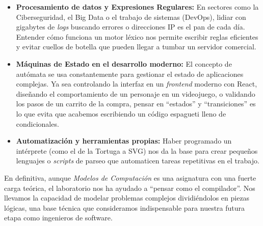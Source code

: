 \documentclass[12pt,a4paper]{article}
\begin{document}
\begin{itemize}
    \item \textbf{Procesamiento de datos y Expresiones Regulares:} En sectores como la Ciberseguridad, el Big Data o el trabajo de sistemas (DevOps), lidiar con gigabytes de \textit{logs} buscando errores o direcciones IP es el pan de cada día. Entender cómo funciona un motor léxico nos permite escribir reglas eficientes y evitar cuellos de botella que pueden llegar a tumbar un servidor comercial.
    \item \textbf{Máquinas de Estado en el desarrollo moderno:} El concepto de autómata se usa constantemente para gestionar el estado de aplicaciones complejas. Ya sea controlando la interfaz en un \textit{frontend} moderno con React, diseñando el comportamiento de un personaje en un videojuego, o validando los pasos de un carrito de la compra, pensar en ``estados'' y ``transiciones'' es lo que evita que acabemos escribiendo un código espagueti lleno de condicionales.
    \item \textbf{Automatización y herramientas propias:} Haber programado un intérprete (como el de la Tortuga a SVG) nos da la base para crear pequeños lenguajes o \textit{scripts} de parseo que automaticen tareas repetitivas en el trabajo.
\end{itemize}

En definitiva, aunque \textit{Modelos de Computación} es una asignatura con una fuerte carga teórica, el laboratorio nos ha ayudado a ``pensar como el compilador''. Nos llevamos la capacidad de modelar problemas complejos dividiéndolos en piezas lógicas, una base técnica que consideramos indispensable para nuestra futura etapa como ingenieros de software.
\end{document}
